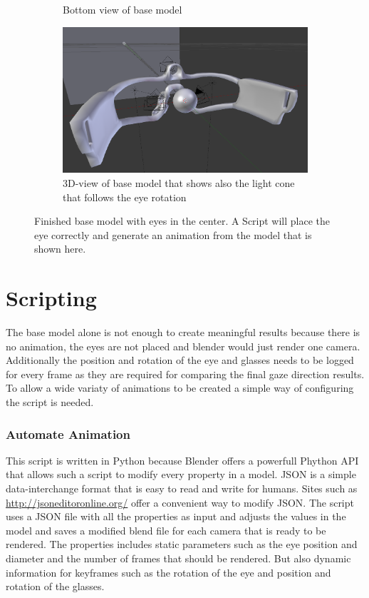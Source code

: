 \begin{figure}
\begin{subfigure}{.5\textwidth}
		\caption{Bottom view of base model}
		\label{fig:baseBottom}
	\end{subfigure}
	\begin{subfigure}{.5\textwidth}
		\centering
		\includegraphics[width=0.9\linewidth]{images/base_model_3D.png}
		\caption{3D-view of base model that shows also the light cone that follows the eye rotation}
		\label{fig:base3D}
	\end{subfigure}
	\caption{Finished base model with eyes in the center. A Script will place the eye correctly and generate an animation from the model that is shown here.}
	\label{fig:baseModel}
\end{figure}
\section{Scripting}
The base model alone is not enough to create meaningful results because there is no animation, the eyes are not placed and blender would just render one camera. Additionally the position and rotation of the eye and glasses needs to be logged for every frame as they are required for comparing the final gaze direction results. To allow a wide variaty of animations to be created a simple way of configuring the script is needed.
\subsubsection{Automate Animation}
This script is written in Python because Blender offers a powerfull Phython API that allows such a script to modify every property in a model. 
JSON is a simple data-interchange format that is easy to read and write for humans. Sites such as \url{http://jsoneditoronline.org/} offer a convenient way to modify JSON. The script uses a JSON file with all the properties as input and adjusts the values in the model and saves a modified blend file for each camera that is ready to be rendered. The properties includes static parameters such as the eye position and diameter and the number of frames that should be rendered. But also dynamic information for keyframes such as the rotation of the eye and position and rotation of the glasses. 
